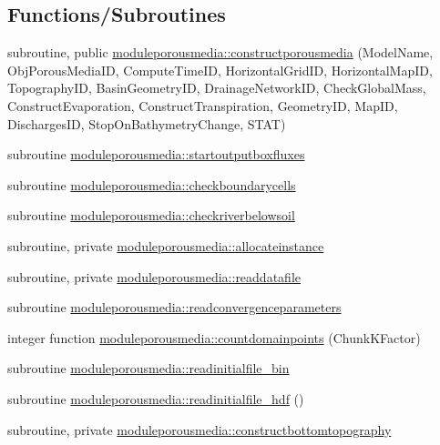 \subsection*{Functions/\+Subroutines}
\begin{DoxyCompactItemize}
\item 
subroutine, public \mbox{\hyperlink{namespacemoduleporousmedia_ac5974f908fab2510640dceca6afdc55e}{moduleporousmedia\+::constructporousmedia}} (Model\+Name, Obj\+Porous\+Media\+ID, Compute\+Time\+ID, Horizontal\+Grid\+ID, Horizontal\+Map\+ID, Topography\+ID, Basin\+Geometry\+ID, Drainage\+Network\+ID, Check\+Global\+Mass, Construct\+Evaporation, Construct\+Transpiration, Geometry\+ID, Map\+ID, Discharges\+ID, Stop\+On\+Bathymetry\+Change, S\+T\+AT)
\item 
subroutine \mbox{\hyperlink{namespacemoduleporousmedia_a964d0ccee02d1c5d84e0ea29ec30b3e7}{moduleporousmedia\+::startoutputboxfluxes}}
\item 
subroutine \mbox{\hyperlink{namespacemoduleporousmedia_a2dddd8490c583823d5dd45c3bb20e816}{moduleporousmedia\+::checkboundarycells}}
\item 
subroutine \mbox{\hyperlink{namespacemoduleporousmedia_a3f2cef78b695643e2f4662105678330c}{moduleporousmedia\+::checkriverbelowsoil}}
\item 
subroutine, private \mbox{\hyperlink{namespacemoduleporousmedia_a52ed3f752ac2299db63f80ea0dca19d2}{moduleporousmedia\+::allocateinstance}}
\item 
subroutine, private \mbox{\hyperlink{namespacemoduleporousmedia_a00f10b641a285b482aecd0a0d9289ed7}{moduleporousmedia\+::readdatafile}}
\item 
subroutine \mbox{\hyperlink{namespacemoduleporousmedia_a8cce03cb321fdeb4b547654baa7cdf81}{moduleporousmedia\+::readconvergenceparameters}}
\item 
integer function \mbox{\hyperlink{namespacemoduleporousmedia_a0fc4ab39d44c6c2942e125f98c3a3466}{moduleporousmedia\+::countdomainpoints}} (Chunk\+K\+Factor)
\item 
subroutine \mbox{\hyperlink{namespacemoduleporousmedia_ad218337265b17e54150c2a4447473293}{moduleporousmedia\+::readinitialfile\+\_\+bin}}
\item 
subroutine \mbox{\hyperlink{namespacemoduleporousmedia_ad6fc7e9521189f7f68bcd991a1724a96}{moduleporousmedia\+::readinitialfile\+\_\+hdf}} ()
\item 
subroutine, private \mbox{\hyperlink{namespacemoduleporousmedia_a3f70a3e3d6c8c8f18b17f1417b314f3e}{moduleporousmedia\+::constructbottomtopography}}

\end{DoxyCompactItemize}
